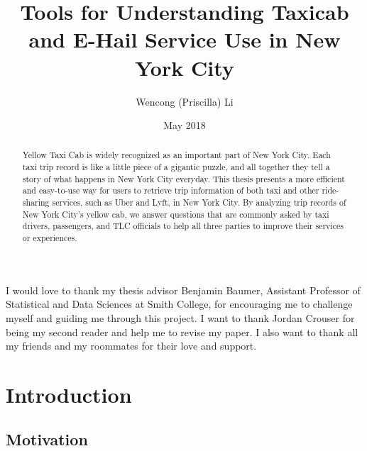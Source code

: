 \documentclass[12pt,twoside]{reedthesis}
\title{Tools for Understanding Taxicab and E-Hail Service Use in New York City}
\author{Wencong (Priscilla) Li}
\date{May 2018}
\theoremstyle{definition}
\theoremstyle{definition}
\theoremstyle{definition}
\theoremstyle{remark}
\begin{document}
  \maketitle

\frontmatter %
\pagestyle{empty} %
  \begin{acknowledgements}
    I would love to thank my thesis advisor Benjamin Baumer, Assistant
    Professor of Statistical and Data Sciences at Smith College, for
    encouraging me to challenge myself and guiding me through this project.
    I want to thank Jordan Crouser for being my second reader and help me to
    revise my paper. I also want to thank all my friends and my roommates
    for their love and support.
  \end{acknowledgements}

  \hypersetup{linkcolor=black}
  \setcounter{tocdepth}{2}
  \tableofcontents

  \listoftables

  \listoffigures
  \begin{abstract}
    Yellow Taxi Cab is widely recognized as an important part of New York
    City. Each taxi trip record is like a little piece of a gigantic puzzle,
    and all together they tell a story of what happens in New York City
    everyday. This thesis presents a more efficient and easy-to-use way for
    users to retrieve trip information of both taxi and other ride-sharing
    services, such as Uber and Lyft, in New York City. By analyzing trip
    records of New York City's yellow cab, we answer questions that are
    commonly asked by taxi drivers, passengers, and TLC officials to help
    all three parties to improve their services or experiences.
  \end{abstract}

\mainmatter %
\pagestyle{fancyplain} %

\chapter{Introduction}\label{introduction}

\section{Motivation}\label{motivation}
\end{document}
